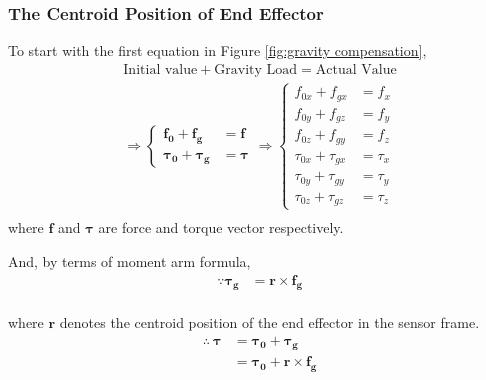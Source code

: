 \subsubsection{The Centroid Position of End Effector}
To start with the first equation in Figure \ref{fig:gravity compensation},
\begin{equation}\label{eq:gc_iga}
\begin{split}
\text{Initial value}	+ \text{Gravity Load} 		= \text{Actual Value} \\
\Rightarrow \left\{\begin{matrix}
\boldsymbol{f_0}		+\boldsymbol{f_g}			&= \boldsymbol{f}\\ 
\boldsymbol{\tau_0}	+\boldsymbol{\tau_g}		&= \boldsymbol{\tau}	
\end{matrix}\right.\Rightarrow \left\{\begin{matrix}
f_{0x} 				+f_{gx} 			&= f_x\\ 
f_{0y}				+f_{gz} 			&= f_y\\ 
f_{0z}				+f_{gy} 			&= f_z\\ 
\tau_{0x}			+\tau_{gx} 			&=\tau _x\\ 
\tau_{0y}			+\tau_{gy} 			&=\tau _y \\ 
\tau_{0z}			+\tau_{gz} 			&=\tau _z 
\end{matrix}\right.	\\
\end{split}
\end{equation}
where $\boldsymbol{f}$ and $\boldsymbol{\tau}$ are force and torque vector respectively.
\par\noindent
And, by terms of moment arm formula,
\begin{equation}
\begin{split}
\because
\boldsymbol{\tau_g}	&= \boldsymbol{r} \times \boldsymbol{f_g} \\
\end{split}
\end{equation}
\par
where $\boldsymbol{r}$ denotes the centroid position of the end effector in the sensor frame.
\begin{equation}
\begin{split}
\therefore\ 
\boldsymbol{\tau}		&= \boldsymbol{\tau_0}	+\boldsymbol{\tau_g}\\
						&= \boldsymbol{\tau_0}	+
						   \boldsymbol{r} \times \boldsymbol{f_g}\\
\end{split}
\end{equation}
